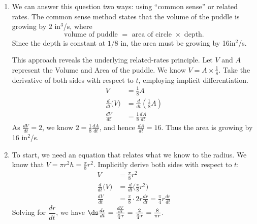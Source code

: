 {\begin{enumerate}
\item We can answer this question two ways: using ``common sense'' or related rates. The common sense method states that the volume of the puddle is growing by $2$ in$^3$/s, where
\[\text{volume of puddle } = \text{ area of circle } \times \text{ depth.}\]
Since the depth is constant at $1/8$ in, the area must be growing by 16in$^2$/s.

This approach reveals the underlying related-rates principle. Let $V$ and $A$ represent the Volume and Area of the puddle. We know $V= A\times \frac18$. Take the derivative of both sides with respect to $t$, employing implicit differentiation.
\begin{align*}
V &= \frac18A\\
\frac{d}{dt}\big(V\big) &= \frac{d}{dt}\left(\frac18A\right)\\
\frac{dV}{dt} &=	\frac18\frac{dA}{dt}
\end{align*} 
As $\frac{dV}{dt} = 2$, we know $2 = \frac18\frac{dA}{dt}$, and hence $\frac{dA}{dt} = 16$. Thus the area is growing by 16 in$^2$/s.

\item		To start, we need an equation that relates what we know to the radius.
We know that $V=\pi r^2h=\frac\pi8r^2$.  Implicitly derive both sides with respect to $t$:
\begin{align*}
 V &= \frac\pi8 r^2 \\
 \frac{d}{dt}\big(V\big) &= \frac{d}{dt}\big(\frac\pi8 r^2\big) \\
 \frac{dV}{dt} &= \frac\pi8\cdot2r\frac{dr}{dt}=\frac\pi4 r\frac{dr}{dt}
\end{align*}
Solving for $\dfrac{dr}{dt}$, we have
$\ds
\frac{dr}{dt}=\frac{\frac{dV}{dt}}{\frac\pi4 r}
=\frac{2}{\frac\pi4 r}=\frac8{\pi r}.
$
%
%


\end{enumerate}}

